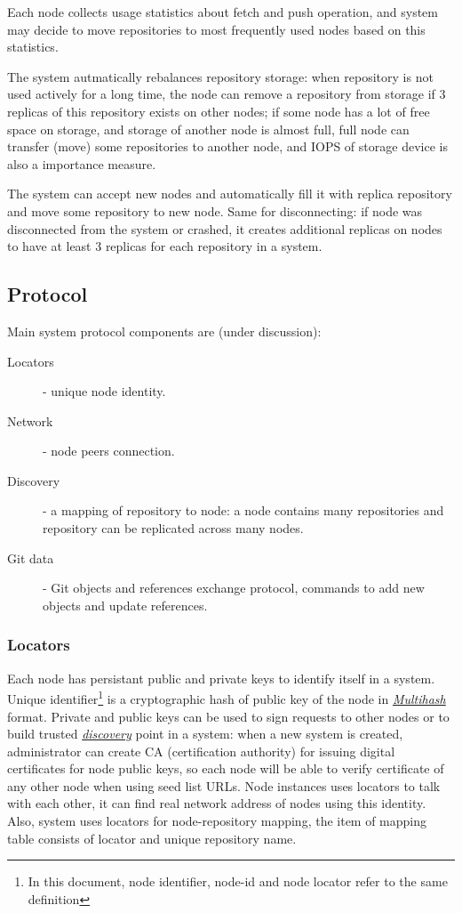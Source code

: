 \documentclass[12pt,oneside]{article}
\begin{document}
Each node collects usage statistics about fetch and push operation, and system may decide to move repositories
to most frequently used nodes based on this statistics.

The system autmatically rebalances repository storage: when repository is not used actively for a
long time, the node can remove a repository from storage if 3 replicas of this repository exists on other nodes;
if some node has a lot of free space on storage, and storage of another node is almost full,
full node can transfer (move) some repositories to another node, and IOPS of storage device is also
a importance measure.

The system can accept new nodes and automatically fill it with replica repository and
move some repository to new node. Same for disconnecting: if node was disconnected from the system or crashed,
it creates additional replicas on nodes to have at least 3 replicas for each repository in a system.

\subsection{Protocol}
Main system protocol components are (under discussion):
\begin{description}
  \item[Locators] - unique node identity.
  \item[Network] - node peers connection.
  \item[Discovery] - a mapping of repository to node: a node contains many repositories and
    repository can be replicated across many nodes.
  \item[Git data] - Git objects and references exchange protocol, commands to add new objects and update references.
\end{description}

\subsubsection{Locators}
Each node has persistant public and private keys to identify itself in a system.
Unique identifier\footnote{In this document, node identifier, node-id and node locator refer to the same definition}
is a cryptographic hash of public key of the node in \emph{\href{https://multiformats.io/multihash/}{Multihash}} format.
Private and public keys can be used to sign requests to other nodes or to build trusted \emph{\hyperref[sec:discovery]{discovery}}
point in a system: when a new system is created, administrator can create CA (certification authority) for issuing
digital certificates for node public keys, so each node will be able to verify certificate of any other node when
using seed list URLs. Node instances uses locators to talk with each other, it can find real network address of nodes using
this identity. Also, system uses locators for node-repository mapping, the item of mapping table consists of
locator and unique repository name.
\end{document}
